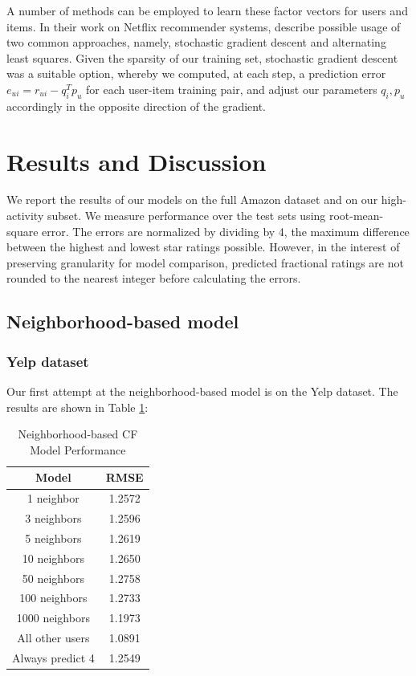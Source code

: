 \documentclass[letterpaper, 11 pt, conference]{ieeeconf}
\begin{document}
A number of methods can be employed to learn these factor vectors for
users and items. In their work on Netflix recommender systems,
\cite{bib:bellkor} describe possible usage of two common approaches, namely,
stochastic gradient descent and alternating least squares. Given the
sparsity of our training set, stochastic gradient descent was a suitable
option, whereby we computed, at each step, a prediction error $e_{ui}
=r_{ui}-q_i^Tp_u$ for each user-item training pair, and adjust our
parameters $q_i,p_u$ accordingly in the opposite direction of the gradient.


\section{Results and Discussion}
\label{sec:results}

We report the results of our models on the full Amazon dataset and on our 
high-activity subset. We measure performance over the test sets using 
root-mean-square error. The errors are normalized by dividing by 4, the maximum 
difference between the highest and lowest star ratings possible. However, 
in the interest of preserving granularity for model comparison, predicted
fractional ratings are not rounded to the nearest integer before calculating 
the errors. 

\subsection{Neighborhood-based model}

\subsubsection{Yelp dataset}
Our first attempt at the neighborhood-based model is on the Yelp dataset. The 
results are shown in Table \ref{table:modelone_yelp}:

\begin{table}[htb]
\centering
\begin{tabular}{|c|c|}
\hline
{\bf Model} &{\bf RMSE} \tabularnewline \hline
1 neighbor &1.2572 \tabularnewline
3 neighbors &1.2596 \tabularnewline
5 neighbors &1.2619 \tabularnewline
10 neighbors &1.2650 \tabularnewline
50 neighbors &1.2758 \tabularnewline
100 neighbors &1.2733 \tabularnewline
1000 neighbors &1.1973 \tabularnewline
\hline
All other users &1.0891 \tabularnewline
Always predict 4 &1.2549
\tabularnewline \hline

\end{tabular}
\caption{ Neighborhood-based CF Model Performance }
\label{table:modelone_yelp}
\end{table}
\end{document}
